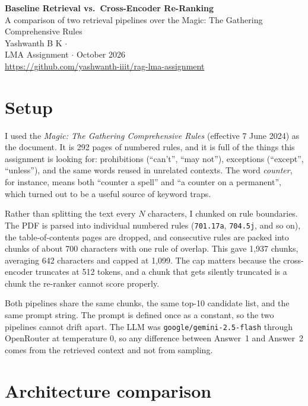 \documentclass[11pt,a4paper]{article}
\newcommand{\code}[1]{\texttt{\small #1}}
\begin{document}
\begin{center}
{\Large\bfseries Baseline Retrieval vs.\ Cross-Encoder Re-Ranking}\\[0.35em]
{\normalsize A comparison of two retrieval pipelines over the Magic: The Gathering Comprehensive Rules}\\[0.9em]
{\normalsize Yashwanth B K \quad$\cdot$}\\[0.35em]
{\small LMA Assignment \quad$\cdot$ October 2026}\\[0.35em]
{\small\url{https://github.com/yashwanth-iiit/rag-lma-assignment}}
\end{center}

\vspace{0.4em}

\section{Setup}

I used the \emph{Magic: The Gathering Comprehensive Rules} (effective 7 June 2024) as the
document. It is 292 pages of numbered rules, and it is full of the things this assignment is
looking for: prohibitions (``can't'', ``may not''), exceptions (``except'', ``unless''), and
the same words reused in unrelated contexts. The word \emph{counter}, for instance, means both
``counter a spell'' and ``a counter on a permanent'', which turned out to be a useful source of
keyword traps.

Rather than splitting the text every $N$ characters, I chunked on rule boundaries. The PDF is
parsed into individual numbered rules (\code{701.17a}, \code{704.5j}, and so on), the
table-of-contents pages are dropped, and consecutive rules are packed into chunks of about 700
characters with one rule of overlap. This gave 1{,}937 chunks, averaging 642 characters and
capped at 1{,}099. The cap matters because the cross-encoder truncates at 512 tokens, and a
chunk that gets silently truncated is a chunk the re-ranker cannot score properly.

Both pipelines share the same chunks, the same top-10 candidate list, and the same prompt
string. The prompt is defined once as a constant, so the two pipelines cannot drift apart. The
LLM was \code{google/gemini-2.5-flash} through OpenRouter at temperature 0, so any difference
between Answer~1 and Answer~2 comes from the retrieved context and not from sampling.

\section{Architecture comparison}
\end{document}
